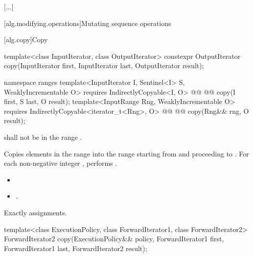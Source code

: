 [...]

[alg.modifying.operations]{Mutating sequence operations}

[alg.copy]{Copy}

%
\begin{itemdecl}
template<class InputIterator, class OutputIterator>
  constexpr OutputIterator copy(InputIterator first, InputIterator last,
                                OutputIterator result);
\end{itemdecl}\begin{addedblock}\begin{itemdecl}
namespace ranges {
  template<InputIterator I, Sentinel<I> S, WeaklyIncrementable O>
    requires IndirectlyCopyable<I, O>
    @@
    @@
      copy(I first, S last, O result);
  template<InputRange Rng, WeaklyIncrementable O>
    requires IndirectlyCopyable<iterator_t<Rng>, O>
    @@
    @@
      copy(Rng&& rng, O result);
}
\end{itemdecl}\end{addedblock}

\begin{itemdescr}
\pnum
\requires {} shall not be in the range .

\pnum
\effects Copies elements in the range  into the range  starting from  and proceeding to . For each non-negative integer , performs .

\pnum
\returns
\begin{itemize}
\item {} 
\item {} .
\end{itemize}

\pnum
\complexity Exactly  assignments.
\end{itemdescr}

%
\begin{itemdecl}
template<class ExecutionPolicy, class ForwardIterator1, class ForwardIterator2>
  ForwardIterator2 copy(ExecutionPolicy&& policy,
                        ForwardIterator1 first, ForwardIterator1 last,
                        ForwardIterator2 result);
\end{itemdecl}

